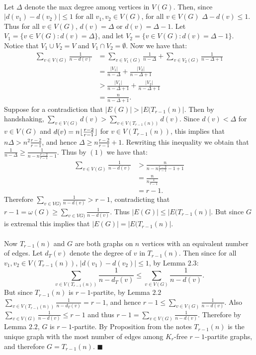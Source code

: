 \documentclass[letterpaper,12pt,oneside,onecolumn]{article}
\DeclarePairedDelimiter\floor{\lfloor}{\rfloor}
\begin{document}
\paragraph{}
Let $\Delta$ denote the max degree among vertices in $V(G)$. Then, since $|d(v_1) - d(v_2)| \leq 1$ for all $v_1, v_2 \in V(G)$, for all $v \in V(G)$ $\Delta - d(v) \leq 1$. Thus for all $v \in V(G)$, $d(v) = \Delta$ or $d(v) = \Delta - 1$. Let $V_1 = \{ v \in V(G) : d(v) = \Delta\}$, and let $V_2 = \{ v \in V(G) : d(v) = \Delta - 1\}$. Notice that $V_1 \cup V_2 = V$ and $V_1 \cap V_2 = \emptyset$. Now we have that:
\begin{align}
\sum_{v \in V(G)} \frac{1}{n-d(v)} &= \sum_{v \in V_1(G)} \frac{1}{n-\Delta} + \sum_{v \in V_2(G)} \frac{1}{n-\Delta + 1} \nonumber \\
&= \frac{|V_1|}{n-\Delta} + \frac{|V_2|}{n - \Delta + 1} \nonumber \\
&> \frac{|V_1|}{n - \Delta + 1} + \frac{|V_2|}{n-\Delta + 1} \nonumber \\
&= \frac{n}{n-\Delta + 1}.
\end{align}
Suppose for a contradiction that $|E(G)| > |E(T_{r-1}(n)|$. Then by handshaking, $\sum_{v \in V(G)} d(v) > \sum_{v \in V(T_{r-1}(n))} d(v)$. Since $d(v) < \Delta$ for $v \in V(G)$ and $d(v) = n\floor{\frac{r-2}{r-1}}$ for $v \in V(T_{r-1}(n))$, this implies that $n\Delta > n^2\frac{r-2}{r-1}$, and hence $\Delta \geq n\frac{r-2}{r-1} + 1$. Rewriting this inequality we obtain that $\frac{1}{n-\Delta} \geq \frac{1}{n - n\frac{r-2}{r-1} -1}$. Thus by $(1)$ we have that:
\begin{align*}
\sum_{v \in V(G)} \frac{1}{n-d(v)} &> \frac{n}{n - n\frac{r-2}{r-1} - 1 + 1} \\
&= \frac{n}{n\frac{1}{r-1}} \\
&= r-1.
\end{align*}
Therefore $\sum_{v \in VG)} \frac{1}{n-d(v)} > r-1$, contradicting that $r-1 = \omega(G) \geq \sum_{v \in VG)} \frac{1}{n-d(v)}$. Thus $|E(G)| \leq |E(T_{r-1}(n)|$. But since $G$ is extremal this implies that $|E(G)|  = |E(T_{r-1}(n)|$.
\paragraph{}
Now $T_{r-1}(n)$ and $G$ are both graphs on $n$ vertices with an equivalent number of edges. Let $d_T(v)$ denote the degree of $v$ in $T_{r-1}(n)$. Then since for all $v_1, v_2 \in V(T_{r-1}(n))$, $|d(v_1) - d(v_2)| \leq 1$, by Lemma $2.3$:
$$
\sum_{v \in V(T_{r-1}(n))}\frac{1}{n - d_T(v)} \leq \sum_{v \in V(G)} \frac{1}{n-d(v)}.
$$
But since $T_{r-1}(n)$ is $r-1$-partite, by Lemma $2.2$ $\sum_{v \in V(T_{r-1}(n))}\frac{1}{n - d_T(v)} = r-1$, and hence $r-1 \leq \sum_{v \in V(G)} \frac{1}{n-d(v)}$. Also $\sum_{v \in V(G)} \frac{1}{n-d(v)} \leq r-1$ and thus $r-1 = \sum_{v \in V(G)} \frac{1}{n-d(v)}$. Therefore by Lemma $2.2$, $G$ is $r-1$-partite. By Proposition from the notes $T_{r-1}(n)$ is the unique graph with the most number of edges among $K_r$-free $r-1$-partite graphs, and therefore $G = T_{r-1}(n)$. $\blacksquare$
\end{document}
